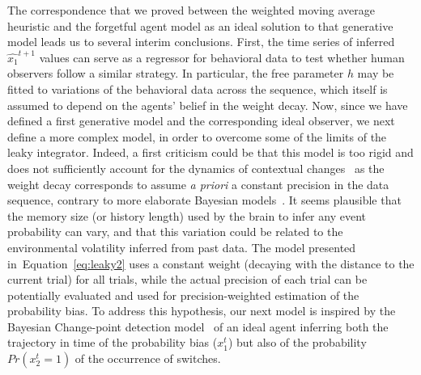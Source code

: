 \documentclass[12pt,english]{article}%
\newcommand{\citep}[1]{\parencite{#1}}
\newcommand{\seeFig}[1]{Figure~\ref{fig:#1}}
\newcommand{\seeEq}[1]{Equation~\ref{eq:#1}}
\begin{document}
The correspondence that we proved between the weighted moving average heuristic
and the forgetful agent model as an ideal solution to that generative model leads
us to several interim conclusions.
First, the time series of inferred $\hat{x_1}^{t+1}$ values
can serve as a regressor for behavioral data
to test whether human observers follow a similar strategy.
In particular, the free parameter $h$
may be fitted to variations of the behavioral data across the sequence,
which itself is assumed to depend on the agents' belief in the weight decay.
Now, since we have defined a first generative model
and the corresponding ideal observer,
we next define a more complex model,
in order to overcome some of the limits of the leaky integrator.
Indeed, a first criticism could be that
this model is too rigid and does not sufficiently
account for the dynamics of contextual changes~\citep{Behrens07}
as the weight decay corresponds to assume \emph{a priori} a constant precision in the data sequence, contrary to more elaborate Bayesian models~\citep{Vilares2011}.
It seems plausible that the memory size (or history length) used by the brain
to infer any event probability can vary, and that this variation could be related
to the environmental volatility inferred from past data.
The model presented in~\seeEq{leaky2} uses a constant weight
(decaying with the distance to the current trial)
for all trials, while the actual precision of each trial
can be potentially evaluated and used
for precision-weighted estimation of the probability bias.
To address this hypothesis, our next model is inspired
by the Bayesian Change-point detection model~\citep{AdamsMackay2007}
of an ideal agent inferring
both the trajectory in time of the probability bias ($x_1^t$)
but also of the probability $Pr(x_2^t=1)$ of the occurrence of switches.
\end{document}
